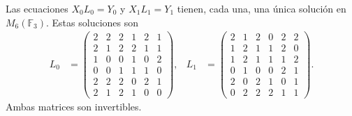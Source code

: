 \begin{theorem}
\label{act21:thm:df-elevaciones-reconstruidas}
Las ecuaciones \(X_0L_0=Y_0\) y \(X_1L_1=Y_1\) tienen, cada una, una
única solución en \(M_6(\mathbb F_3)\). Estas soluciones son
\begin{align*}
 L_0&=\begin{pmatrix}
2&2&2&1&2&1\\2&1&2&2&1&1\\1&0&0&1&0&2\\
0&0&1&1&1&0\\2&2&2&0&2&1\\2&1&2&1&0&0
\end{pmatrix},&
 L_1&=\begin{pmatrix}
2&1&2&0&2&2\\1&2&1&1&2&0\\1&2&1&1&1&2\\
0&1&0&0&2&1\\2&0&2&1&0&1\\0&2&2&2&1&1
\end{pmatrix}.
\end{align*}
Ambas matrices son invertibles.
\end{theorem}

